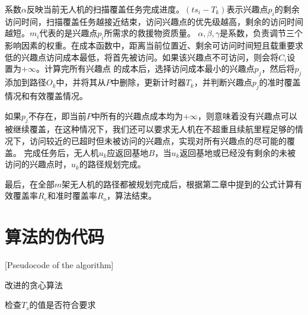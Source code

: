 系数$\alpha$反映当前无人机的扫描覆盖任务完成进度。$(ts_i - T_k)$表示兴趣点$p_i$的剩余访问时间，扫描覆盖任务越接近结束，访问兴趣点的优先级越高，剩余的访问时间越短。$m_i$代表的是兴趣点$p_i$所需求的救援物资质量。
$\alpha,\beta,\gamma$是系数，负责调节三个影响因素的权重。在成本函数中，距离当前位置近、剩余可访问时间短且载重要求低的兴趣点访问成本最低，将首先被访问。如果该兴趣点不可访问，则会将$C_i$设置为$+\infty$。计算完所有兴趣点
的成本后，选择访问成本最小的兴趣点$p_j$，然后将$p_j$添加到路径$O_k$中，并将其从$P$中删除，更新计时器$T_k$，并判断兴趣点$p_j$的准时覆盖情况和有效覆盖情况。


如果$p_j$不存在，即当前$P$中所有的兴趣点成本均为$+\infty$，则意味着没有兴趣点可以被继续覆盖，在这种情况下，我们还可以要求无人机在不超重且续航里程足够的情况下，访问较近的已超时但未被访问的兴趣点，实现对所有兴趣点的尽可能的覆盖。
完成任务后，无人机$u_k$应返回基地$B$，当$u_k$返回基地或已经没有剩余的未被访问的兴趣点时，$u_k$的路径规划完成。


最后，在全部$m$架无人机的路径都被规划完成后，根据第二章中提到的公式计算有效覆盖率$R_e$和准时覆盖率$R_o$，算法结束。

\section{算法的伪代码}[Pseudocode of the algorithm]
 
\begin{algorithm}[H]  %
	\caption{改进的贪心算法}%
	\LinesNumbered %
	检查$T_s$的值是否符合要求\; %
\end{algorithm}


